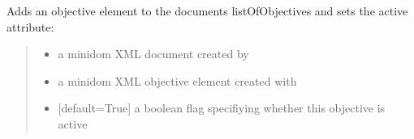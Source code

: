 \documentclass[letterpaper,12pt,english]{sphinxmanual}
\begin{document}
\begin{fulllineitems}
\label{\detokenize{api/io:cbmpy.CBXML.xml_addSBML2FBAObjective}}
\pysigstartsignatures
\pysiglinewithargsret
{}
{\sphinxparamcomma {}\sphinxparamcomma {}}
{}
\pysigstopsignatures
\sphinxAtStartPar
Adds an objective element to the documents listOfObjectives and sets the active attribute:
\begin{quote}\begin{description}
\begin{itemize}
\item {} 
\sphinxAtStartPar
{} \textendash{} a minidom XML document created by 

\item {} 
\sphinxAtStartPar
{} \textendash{} a minidom XML objective element created with 

\item {} 
\sphinxAtStartPar
{} \textendash{} {[}default=True{]} a boolean flag specifiying whether this objective is active

\end{itemize}

\end{description}\end{quote}

\end{fulllineitems}

\end{document}
